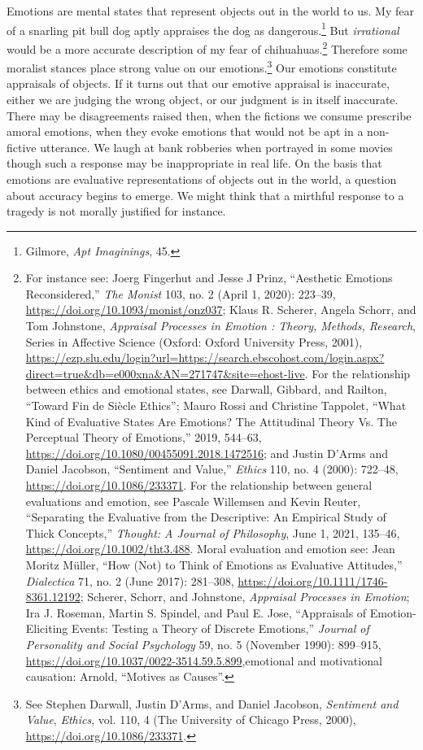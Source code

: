 \documentclass[phdthesis,12pt,final,a4paper]{wuthesis}
\theoremstyle{definition}
\theoremstyle{definition}
\theoremstyle{definition}
\theoremstyle{definition}
\theoremstyle{remark}
\begin{document}
Emotions are mental states that represent objects out in the world to us. My fear of a snarling pit bull dog aptly appraises the dog as dangerous.\footnote{Gilmore, \emph{Apt {Imaginings}}, 45.} But \emph{irrational} would be a more accurate description of my fear of chihuahuas.\footnote{For instance see: Joerg Fingerhut and Jesse J Prinz, {``Aesthetic Emotions Reconsidered,''} \emph{The Monist} 103, no. 2 (April 1, 2020): 223--39, \url{https://doi.org/10.1093/monist/onz037}; Klaus R. Scherer, Angela Schorr, and Tom Johnstone, \emph{Appraisal {Processes} in {Emotion} : {Theory}, {Methods}, {Research}}, Series in {Affective Science} (Oxford: Oxford University Press, 2001), \url{https://ezp.slu.edu/login?url=https://search.ebscohost.com/login.aspx?direct=true&db=e000xna&AN=271747&site=ehost-live}. For the relationship between ethics and emotional states, see Darwall, Gibbard, and Railton, {``Toward Fin de Siècle Ethics''}; Mauro Rossi and Christine Tappolet, {``What {Kind} of {Evaluative States Are Emotions}? {The Attitudinal Theory Vs}. {The Perceptual Theory} of {Emotions},''} 2019, 544--63, \url{https://doi.org/10.1080/00455091.2018.1472516}; and Justin D'Arms and Daniel Jacobson, {``Sentiment and {Value},''} \emph{Ethics} 110, no. 4 (2000): 722--48, \url{https://doi.org/10.1086/233371}. For the relationship between general evaluations and emotion, see Pascale Willemsen and Kevin Reuter, {``Separating the Evaluative from the Descriptive: {An} Empirical Study of Thick Concepts,''} \emph{Thought: A Journal of Philosophy}, June 1, 2021, 135--46, \url{https://doi.org/10.1002/tht3.488}. Moral evaluation and emotion see: Jean Moritz Müller, {``How ({Not}) to {Think} of {Emotions} as {Evaluative Attitudes},''} \emph{Dialectica} 71, no. 2 (June 2017): 281--308, \url{https://doi.org/10.1111/1746-8361.12192}; Scherer, Schorr, and Johnstone, \emph{Appraisal Processes in Emotion}; Ira J. Roseman, Martin S. Spindel, and Paul E. Jose, {``Appraisals of Emotion-Eliciting Events: {Testing} a Theory of Discrete Emotions,''} \emph{Journal of Personality and Social Psychology} 59, no. 5 (November 1990): 899--915, \url{https://doi.org/10.1037/0022-3514.59.5.899},emotional and motivational causation: Arnold, {``Motives as Causes''}.} Therefore some moralist stances place strong value on our emotions.\footnote{See Stephen Darwall, Justin D'Arms, and Daniel Jacobson, \emph{Sentiment and {Value}}, \emph{Ethics}, vol. 110, 4 (The University of Chicago Press, 2000), \url{https://doi.org/10.1086/233371}.} Our emotions constitute appraisals of objects. If it turns out that our emotive appraisal is inaccurate, either we are judging the wrong object, or our judgment is in itself inaccurate. There may be disagreements raised then, when the fictions we consume prescribe amoral emotions, when they evoke emotions that would not be apt in a non-fictive utterance. We laugh at bank robberies when portrayed in some movies though such a response may be inappropriate in real life. On the basis that emotions are evaluative representations of objects out in the world, a question about accuracy begins to emerge. We might think that a mirthful response to a tragedy is not morally justified for instance.
\end{document}
